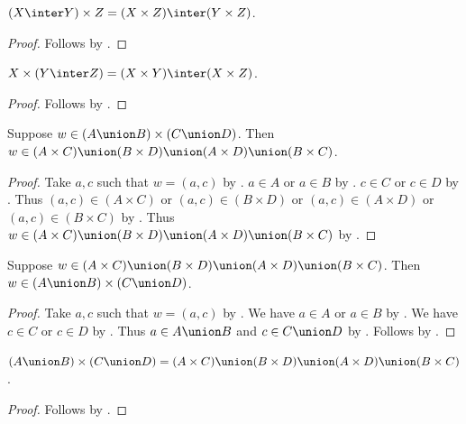 \begin{proposition}\label{inter_times_right}
    $(X\inter Y)\times Z = (X\times Z)\inter (Y\times Z)$.
\end{proposition}
\begin{proof}
    Follows by .
\end{proof}

\begin{proposition}\label{inter_times_left}
    $X\times (Y\inter Z) = (X\times Y)\inter (X\times Z)$.
\end{proposition}
\begin{proof}
    Follows by .
\end{proof}

\begin{proposition}\label{union_times_intro}
    Suppose $w\in(A\union B)\times (C\union D)$.
    Then $w\in(A\times C)\union (B\times D)\union (A\times D)\union (B\times C)$.
\end{proposition}
\begin{proof}
    Take $a,c$ such that $w = (a, c)$
        by .
    $a\in A$ or $a\in B$ by .
    $c\in C$ or $c\in D$ by .
    Thus $(a, c)\in (A\times C)$ or $(a, c)\in (B\times D)$ or $(a, c)\in (A\times D)$ or $(a, c)\in (B\times C)$
        by .
    Thus $w\in (A\times C)\union (B\times D)\union (A\times D)\union (B\times C)$
        by .
\end{proof}

\begin{proposition}\label{union_times_elim}
    Suppose $w\in(A\times C)\union (B\times D)\union (A\times D)\union (B\times C)$.
    Then $w\in(A\union B)\times (C\union D)$.
\end{proposition}
\begin{proof}
    Take $a,c$ such that $w = (a,c)$
        by .
    We have $a\in A$ or $a\in B$
        by .
    We have $c\in C$ or $c\in D$
        by .
    Thus $a\in A\union B$ and $c\in C\union D$ by .
    Follows by .
\end{proof}

\begin{proposition}\label{union_times}
    $(A\union B)\times (C\union D) = (A\times C)\union (B\times D)\union (A\times D)\union (B\times C)$.
\end{proposition}
\begin{proof}
    Follows by .
\end{proof}

